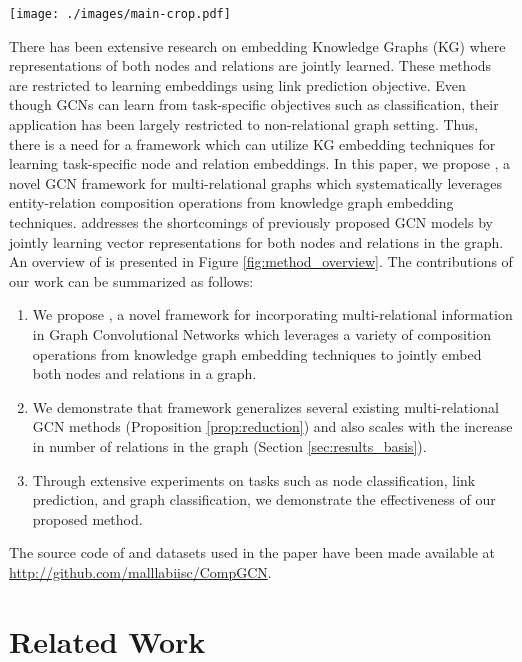 \documentclass{article} \usepackage{iclr2020_conference,times}
\begin{document}
\begin{figure*}[t]	
	\centering	
	\texttt{[image: ./images/main-crop.pdf]}	
	\caption{\label{fig:method_overview} Overview of \method{}. Given node and relation embeddings, \method{} performs a composition operation  over each edge in the neighborhood of a central node (e.g. \textit{Christopher Nolan} above). The composed embeddings are then convolved with specific filters  and  for original and inverse relations respectively. We omit self-loop in the diagram for clarity. The message from all the neighbors are then aggregated to get an updated embedding of the central node. Also, the relation embeddings are transformed using a separate weight matrix. Please refer to Section \ref{sec:details} for details.
	}	
\end{figure*}

There has been extensive research on embedding Knowledge Graphs (KG) \citep{survey2016nickel,survey2017} where representations of both nodes and relations are jointly learned. These methods are restricted to learning embeddings using link prediction objective. Even though GCNs can learn from task-specific objectives such as classification, their application has been largely restricted to non-relational graph setting. 
Thus, there is a need for a framework which can utilize KG embedding techniques for learning task-specific node and relation embeddings.  In this paper, we propose \method{}, a novel GCN framework for multi-relational graphs which systematically leverages entity-relation composition operations from knowledge graph embedding techniques.
\method{} addresses the shortcomings of previously proposed GCN models by jointly learning vector representations for both nodes and relations in the graph. An overview of \method{} is presented in Figure \ref{fig:method_overview}.
The contributions of our work can be summarized as follows:

\begin{enumerate}[itemsep=2pt,parsep=0pt,partopsep=0pt,leftmargin=*,topsep=0.2pt]
	\item We propose \method{}, a novel framework for incorporating multi-relational information in Graph Convolutional Networks which leverages a variety of composition operations from knowledge graph embedding techniques to jointly embed both nodes and relations in a graph.
	\item We demonstrate that \method{} framework generalizes several existing multi-relational GCN methods (Proposition \ref{prop:reduction}) and also scales with the increase in number of relations in the graph (Section \ref{sec:results_basis}). 
\item Through extensive experiments on tasks such as node classification, link prediction, and graph classification, we demonstrate the effectiveness of our proposed method.
\end{enumerate} 
\noindent The source code of \method{} and datasets used in the paper have been made available at {\color{blue} \url{http://github.com/malllabiisc/CompGCN}}. \section{Related Work}
\label{sec:related_work}
\end{document}
